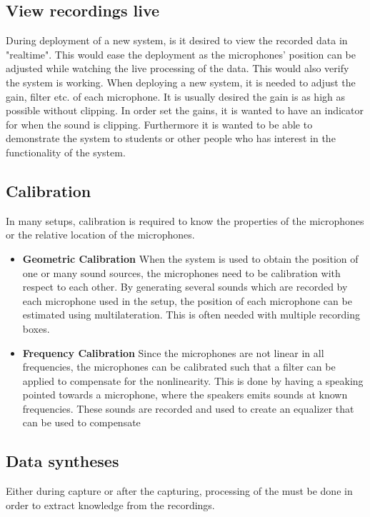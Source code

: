 \subsection{View recordings live}
During deployment of a new system, is it desired to view the recorded data in "realtime". This would ease the deployment as the microphones' position can be adjusted while watching the live processing of the data. This would also verify the system is working.
When deploying a new system, it is needed to adjust the gain, filter etc. of each microphone. It is usually desired the gain is as high as possible without clipping. In order set the gains, it is wanted to have an indicator for when the sound is clipping.
Furthermore it is wanted to be able to demonstrate the system to students or other people who has interest in the functionality of the system.

\subsection{Calibration}
In many setups, calibration is required to know the properties of the microphones or the relative location of the microphones.
\begin{itemize}
	\item \textbf{Geometric Calibration} When the system is used to obtain the position of one or many sound sources, the microphones need to be calibration with respect to each other. By generating several sounds which are recorded by each microphone used in the setup, the position of each microphone can be estimated using multilateration. This is often needed with multiple recording boxes.
	
	\item \textbf{Frequency Calibration} Since the microphones are not linear in all frequencies, the microphones can be calibrated such that a filter can be applied to compensate for the nonlinearity.
This is done by having a speaking pointed towards a microphone, where the speakers emits sounds at known frequencies. These sounds are recorded and used to create an equalizer that can be used to compensate

\end{itemize}

\subsection{Data syntheses}
Either during capture or after the capturing, processing of the must be done in order to extract knowledge from the recordings.

